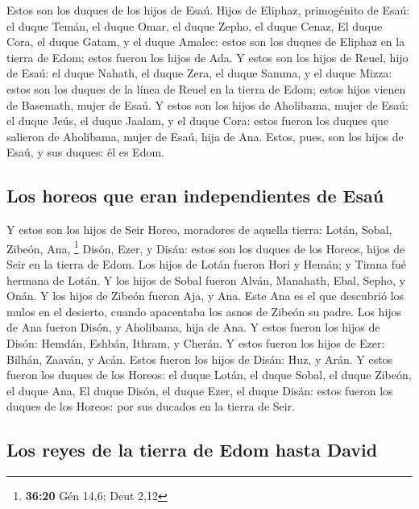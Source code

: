  Estos son los duques de los hijos de Esaú. Hijos de
Eliphaz, primogénito de Esaú: el duque Temán, el duque Omar, el duque
Zepho, el duque Cenaz,  El duque Cora, el duque Gatam, y
el duque Amalec: estos son los duques de Eliphaz en la tierra de Edom;
estos fueron los hijos de Ada.  Y estos son los hijos de
Reuel, hijo de Esaú: el duque Nahath, el duque Zera, el duque Samma, y
el duque Mizza: estos son los duques de la línea de Reuel en la tierra
de Edom; estos hijos vienen de Basemath, mujer de Esaú. 
Y estos son los hijos de Aholibama, mujer de Esaú: el duque Jeús, el
duque Jaalam, y el duque Cora: estos fueron los duques que salieron de
Aholibama, mujer de Esaú, hija de Ana.  Estos, pues, son
los hijos de Esaú, y sus duques: él es Edom.

\hypertarget{los-horeos-que-eran-independientes-de-esauxfa}{%
\subsection{Los horeos que eran independientes de
Esaú}\label{los-horeos-que-eran-independientes-de-esauxfa}}

 Y estos son los hijos de Seir Horeo, moradores de
aquella tierra: Lotán, Sobal, Zibeón, Ana, \footnote{\textbf{36:20} Gén
  14,6; Deut 2,12}  Disón, Ezer, y Disán: estos son los
duques de los Horeos, hijos de Seir en la tierra de Edom.
 Los hijos de Lotán fueron Hori y Hemán; y Timna fué
hermana de Lotán.  Y los hijos de Sobal fueron Alván,
Manahath, Ebal, Sepho, y Onán.  Y los hijos de Zibeón
fueron Aja, y Ana. Este Ana es el que descubrió los mulos en el
desierto, cuando apacentaba los asnos de Zibeón su padre.
 Los hijos de Ana fueron Disón, y Aholibama, hija de Ana.
 Y estos fueron los hijos de Disón: Hemdán, Eshbán,
Ithram, y Cherán.  Y estos fueron los hijos de Ezer:
Bilhán, Zaaván, y Acán.  Estos fueron los hijos de Disán:
Huz, y Arán.  Y estos fueron los duques de los Horeos: el
duque Lotán, el duque Sobal, el duque Zibeón, el duque Ana,
 El duque Disón, el duque Ezer, el duque Disán: estos
fueron los duques de los Horeos: por sus ducados en la tierra de Seir.

\hypertarget{los-reyes-de-la-tierra-de-edom-hasta-david}{%
\subsection{Los reyes de la tierra de Edom hasta
David}\label{los-reyes-de-la-tierra-de-edom-hasta-david}}

